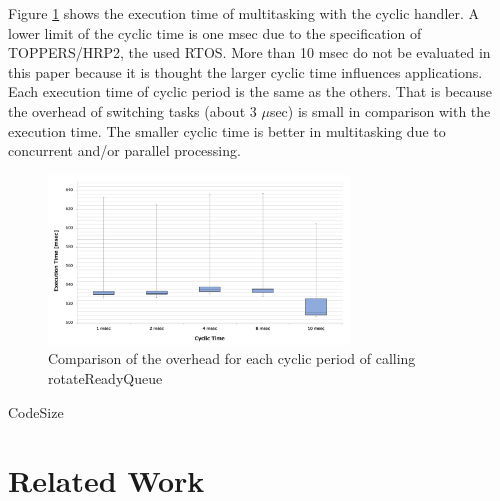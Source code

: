 \documentclass[conference,compsoc]{IEEEtran}
\begin{document}
Figure \ref{fig:comparison_msec} shows the execution time of multitasking with the cyclic handler.
A lower limit of the cyclic time is one msec due to the specification of TOPPERS/HRP2, the used RTOS.
More than 10 msec do not be evaluated in this paper because it is thought the larger cyclic time influences applications.
Each execution time of cyclic period is the same as the others.
That is because the overhead of switching tasks (about 3 $\mu$sec) is small in comparison with the execution time.
The smaller cyclic time is better in multitasking due to concurrent and/or parallel processing.

\begin{figure}[t]
    \centering
    \includegraphics[width=8cm,clip]{figure/comparison_msec.pdf}
    \caption{Comparison of the overhead for each cyclic period of calling rotateReadyQueue}
    \label{fig:comparison_msec}
\end{figure}
 
CodeSize

\section{Related Work}
\label{sec:Related work}
\end{document}
